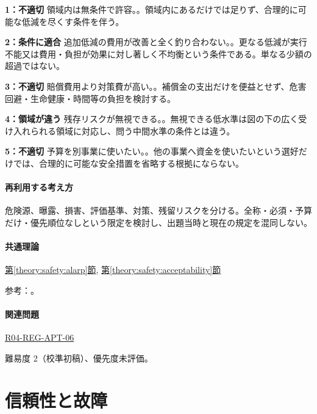 \noindent\textbf{1：不適切} 領域内は無条件で許容。。領域内にあるだけでは足りず、合理的に可能な低減を尽くす条件を伴う。\par

\noindent\textbf{2：条件に適合} 追加低減の費用が改善と全く釣り合わない。。更なる低減が実行不能又は費用・負担が効果に対し著しく不均衡という条件である。単なる少額の超過ではない。\par

\noindent\textbf{3：不適切} 賠償費用より対策費が高い。。補償金の支出だけを便益とせず、危害回避・生命健康・時間等の負担を検討する。\par

\noindent\textbf{4：領域が違う} 残存リスクが無視できる。。無視できる低水準は図の下の広く受け入れられる領域に対応し、問う中間水準の条件とは違う。\par

\noindent\textbf{5：不適切} 予算を別事業に使いたい。。他の事業へ資金を使いたいという選好だけでは、合理的に可能な安全措置を省略する根拠にならない。\par

\paragraph{再利用する考え方} 危険源、曝露、損害、評価基準、対策、残留リスクを分ける。全称・必須・予算だけ・優先順位なしという限定を検討し、出題当時と現在の規定を混同しない。

\paragraph{共通理論} \hyperref[theory:safety:alarp]{第\ref*{theory:safety:alarp}節}, \hyperref[theory:safety:acceptability]{第\ref*{theory:safety:acceptability}節}

\par 参考：\cite{saf_parliament2006,saf_ra2006}。

\paragraph{関連問題} \hyperref[q:r04-reg-apt-06]{R04-REG-APT-06}

\par 難易度 2（校準初稿）、優先度未評価。

\section{信頼性と故障}

